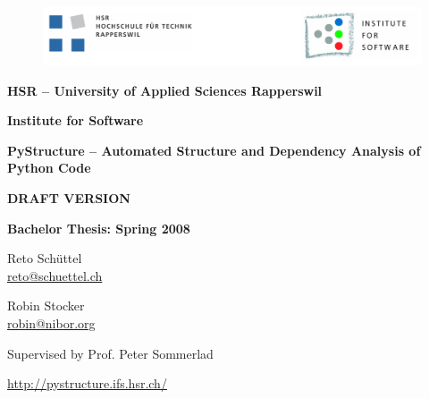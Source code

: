 \documentclass[12pt,halfparskip]{scrreprt}
\begin{document}
\begin{titlepage}

\thispagestyle{empty}

\begin{center}

\begin{figure}[h]
 \centering
 \vspace{0,5cm}
 \includegraphics[width=\textwidth]{img/hsr_logo}
\end{figure}

\vspace{1cm}
{\Large \bfseries HSR -- University of Applied Sciences Rapperswil}

\vspace{0,5cm}
{\Large \bfseries Institute for Software}

\vspace{2cm}
{\Huge \bfseries PyStructure -- Automated Structure and Dependency Analysis of Python Code}

{\Large \bfseries DRAFT VERSION}

\vspace{2cm}

{\Large \bfseries Bachelor Thesis: Spring 2008}

\vspace{0,5cm}
\SVNDate


\vspace{1cm}
Reto Schüttel \\ \url{reto@schuettel.ch}

\vspace{0,5cm}
Robin Stocker \\ \url{robin@nibor.org}

\vspace{0,5cm}
Supervised by Prof. Peter Sommerlad


\vspace{1cm}
\url{http://pystructure.ifs.hsr.ch/}

\end{center}
\end{titlepage}


\pagestyle{plain}

\end{document}
